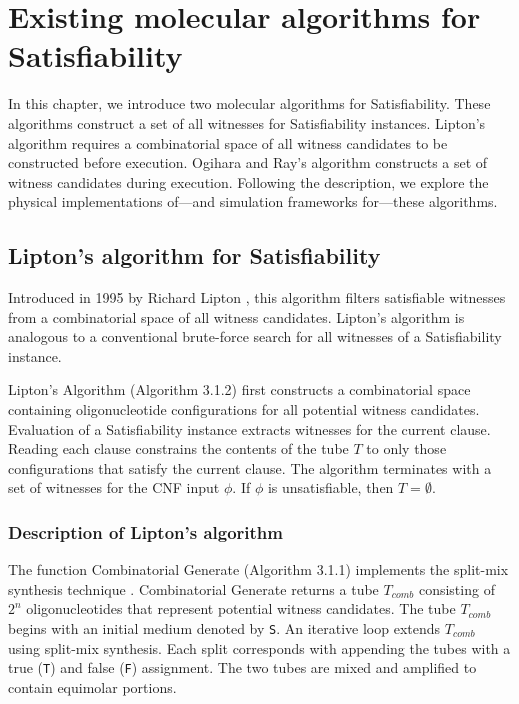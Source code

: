 \chapter{Existing molecular algorithms for {\sc Satisfiability}}


In this chapter, we introduce two molecular algorithms for {\sc Satisfiability}.  These algorithms construct a set of all witnesses for {\sc Satisfiability} instances.  Lipton's algorithm requires a combinatorial space of all witness candidates to be constructed before execution.  Ogihara and Ray's algorithm constructs a set of witness candidates during execution.  Following the description, we explore the physical implementations of---and simulation frameworks for---these algorithms.
\section{Lipton's algorithm for {\sc Satisfiability}}


Introduced in 1995 by Richard Lipton \cite{Lipton95usingdna}, this algorithm filters satisfiable witnesses from a combinatorial space of all witness candidates.  Lipton's algorithm is analogous to a conventional brute-force search for all witnesses of a {\sc Satisfiability} instance.

{\sc Lipton's Algorithm} (Algorithm 3.1.2) first constructs a combinatorial space containing oligonucleotide configurations for all potential witness candidates.  Evaluation of a {\sc Satisfiability} instance extracts witnesses for the current clause.  Reading each clause constrains the contents of the tube $T$ to only those configurations that satisfy the current clause.  The algorithm terminates with a set of witnesses for the CNF input $\phi$.  If $\phi$ is unsatisfiable, then $T = \emptyset$.  

	\subsection{Description of Lipton's algorithm}
		
The function {\sc Combinatorial Generate} (Algorithm 3.1.1) implements the split-mix synthesis technique \cite{furka1982, furkaBook}.  {\sc Combinatorial Generate} returns a tube $T_{comb}$ consisting of $2^n$ oligonucleotides that represent potential witness candidates.  The tube $T_{comb}$ begins with an initial medium denoted by \texttt{S}.  An iterative loop extends $T_{comb}$ using split-mix synthesis.  Each split corresponds with appending the tubes with a true (\texttt{T}) and false (\texttt{F}) assignment.  The two tubes are mixed and amplified to contain equimolar portions.  


